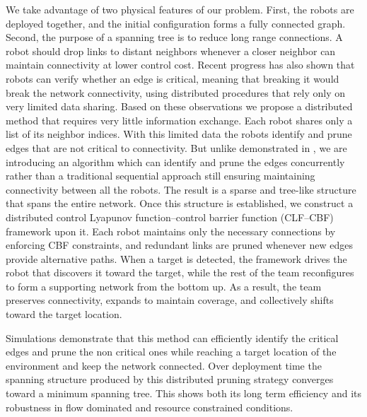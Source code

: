 \documentclass[conference]{IEEEconf}
\theoremstyle{plain}
\begin{document}
We take advantage of two physical features of our problem. First, the robots are deployed together, and the initial configuration forms a fully connected graph. Second, the purpose of a spanning tree is to reduce long range connections. A robot should drop links to distant neighbors whenever a closer neighbor can maintain connectivity at lower control cost. Recent progress \cite{venkateswaran2024} has also shown that robots can verify whether an edge is critical, meaning that breaking it would break the network connectivity, using distributed procedures that rely only on very limited data sharing. Based on these observations we propose a distributed method that requires very little information exchange. Each robot shares only a list of its neighbor indices. With this limited data the robots identify and prune edges that are not critical to connectivity. But unlike demonstrated in \cite{venkateswaran2024}, we are introducing an algorithm which can identify and prune the edges concurrently rather than a traditional sequential approach still ensuring maintaining connectivity between all the robots. The result is a sparse and tree-like structure that spans the entire network. Once this structure is established, we construct a distributed control Lyapunov function–control barrier function (CLF–CBF) framework upon it. Each robot maintains only the necessary connections by enforcing CBF constraints, and redundant links are pruned whenever new edges provide alternative paths. When a target is detected, the framework drives the robot that discovers it toward the target, while the rest of the team reconfigures to form a supporting network from the bottom up. As a result, the team preserves connectivity, expands to maintain coverage, and collectively shifts toward the target location.

Simulations demonstrate that this method can efficiently identify the critical edges and prune the non critical ones while reaching a target location of the environment and keep the network connected. Over deployment time the spanning structure produced by this distributed pruning strategy converges toward a minimum spanning tree. This shows both its long term efficiency and its robustness in flow dominated and resource constrained conditions.
\end{document}
